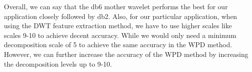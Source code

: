 \documentclass[10pt,twocolumn,letterpaper]{article}
\begin{document}
Overall, we can say that the db6 mother wavelet performs the best for our application closely followed by db2. Also, for our particular application, when using the DWT feature extraction method, we have to use higher scales like scales 9-10 to achieve decent accuracy. While we would only need a minimum decomposition scale of 5 to achieve the same accuracy in the WPD method. However, we can further increase the accuracy of the WPD method by increasing the decomposition levels up to 9-10.

\begin{table}[htbp]
\caption{SVM - Classification Accuracy : DWT vs WPD}
\label{tab:caption}
\end{table}

\end{document}
